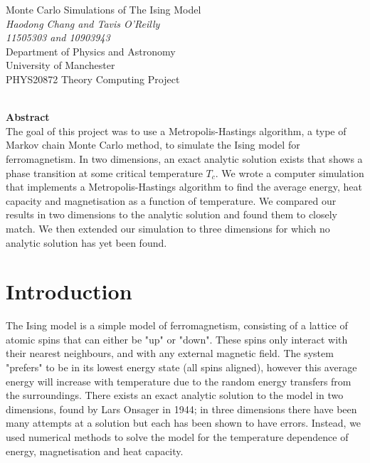 \documentclass[11pt]{article}
\begin{document}
	
	\begin{titlepage}
		\begin{center}
			{\Huge Monte Carlo Simulations of The Ising Model}\\[0.5cm]
			\textit{Haodong Chang and Tavis O'Reilly}\\[0.3cm]
			\textit{11505303 and 10903943}\\[0.3cm]
			Department of Physics and Astronomy\\[0.3cm]
			University of Manchester\\[0.3cm]
			PHYS20872 Theory Computing Project\\[0.3cm]
			\shortmonthname[\the\month]  \the\year \\[4cm]
			
		\end{center}
		
		{\Large \textbf{Abstract}}\\[0.3cm]
		The goal of this project was to use a Metropolis-Hastings algorithm, a type of Markov chain Monte Carlo method, to simulate the Ising model for ferromagnetism. In two dimensions, an exact analytic solution exists\cite{onsager_solution} that shows a phase transition at some critical temperature $T_c$. We wrote a computer simulation that implements a Metropolis-Hastings algorithm to find the average energy, heat capacity and magnetisation as a function of temperature. We compared our results in two dimensions to the analytic solution and found them to closely match. We then extended our simulation to three dimensions for which no analytic solution has yet been found.
	\end{titlepage}
	
	\clearpage
	\setcounter{page}{2}
	
	\newpage
	
	\section{Introduction}
	
	The Ising model is a simple model of ferromagnetism, consisting of a lattice of atomic spins that can either be "up" or "down". These spins only interact with their nearest neighbours, and with any external magnetic field. The system "prefers" to be in its lowest energy state (all spins aligned), however this average energy will increase with temperature due to the random energy transfers from the surroundings. There exists an exact analytic solution to the model in two dimensions\cite{onsager_solution}, found by Lars Onsager in 1944; in three dimensions there have been many attempts at a solution\cite{das1970exact}\cite{lou2000three}\cite{zhang2007conjectures}\cite{zhang2021exact} but each has been shown to have errors. Instead, we used numerical methods to solve the model for the temperature dependence of energy, magnetisation and heat capacity.
	
\end{document}
